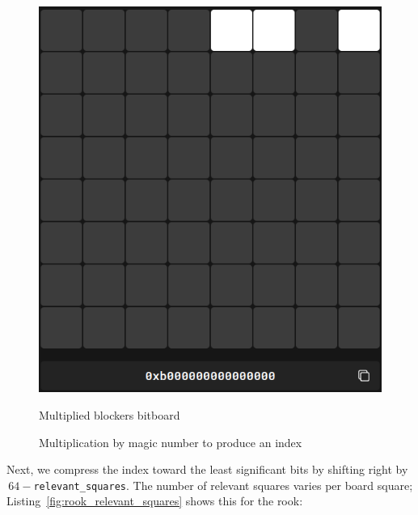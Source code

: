 \begin{figure}[H]
\begin{minipage}[c]{0.4\textwidth}
        \includegraphics[width=\textwidth]{Imagenes/magics_multiplied_blockers.png}
        \caption{Multiplied blockers bitboard}
    \end{minipage}
    \caption{Multiplication by magic number to produce an index}
    \label{fig:magic_multiplication}
\end{figure}

\noindent Next, we compress the index toward the least significant bits by shifting right by \(\,64-\)\texttt{relevant\_squares}. The number of relevant squares varies per board square; Listing~\ref{fig:rook_relevant_squares} shows this for the rook:


